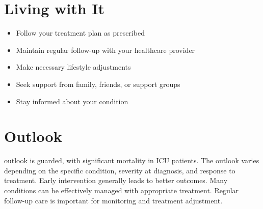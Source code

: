 \section{Living with It}
\begin{itemize}[noitemsep]
  \item Follow your treatment plan as prescribed
  \item Maintain regular follow-up with your healthcare provider
  \item Make necessary lifestyle adjustments
  \item Seek support from family, friends, or support groups
  \item Stay informed about your condition
\end{itemize}
\section{Outlook}
outlook is guarded, with significant mortality in ICU patients. The outlook varies depending on the specific condition, severity at diagnosis, and response to treatment. Early intervention generally leads to better outcomes. Many conditions can be effectively managed with appropriate treatment. Regular follow-up care is important for monitoring and treatment adjustment.
